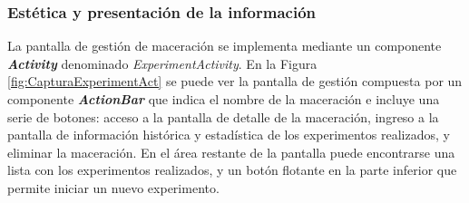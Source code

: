             \subsubsection{Estética y presentación de la información}
                \par La pantalla de gestión de maceración se implementa mediante un componente \textbf{\textit{\gls{Activity}}} denominado \textit{ExperimentActivity}. En la Figura \ref{fig:CapturaExperimentAct} se puede ver la pantalla de gestión compuesta por un componente \textbf{\textit{\gls{ActionBar}}} que indica el nombre de la maceración e incluye una serie de botones: acceso a la pantalla de detalle de la maceración, ingreso a la pantalla de información histórica y estadística de los experimentos realizados, y  eliminar la maceración. En el área restante de la pantalla puede encontrarse una lista con los experimentos realizados, y un botón flotante en la parte inferior que permite iniciar un nuevo experimento. %
